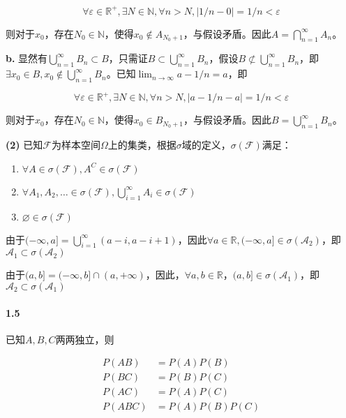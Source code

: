\documentclass{article}
\begin{document}
    \begin{equation}
        \forall \varepsilon \in \mathbb R^+, \exists N \in \mathbb N, \forall n > N, |1/n - 0| = 1/n < \varepsilon
    \end{equation}

    则对于$x_0$，存在$N_0\in \mathbb N$，使得$x_0\not \in A_{N_0 + 1}$，与假设矛盾。因此$A = \bigcap _{n=1} ^{\infty} A_n$。

    \textbf{b.} 显然有$\bigcup _{n=1}^\infty B_n\subset B$，只需证$B\subset \bigcup _{n=1}^\infty B_n$，假设$B\not\subset \bigcup _{n=1}^\infty B_n$，即$\exists x_0\in B, x_0\not \in \bigcup _{n=1}^\infty B_n$。已知$\lim_{n\rightarrow \infty} a - 1/n = a$，即

    \begin{equation}
        \forall \varepsilon \in \mathbb R^+, \exists N\in \mathbb N, \forall n > N, |a - 1/n - a| = 1/n < \varepsilon
    \end{equation}

    则对于$x_0$，存在$N_0\in \mathbb N$，使得$x_0 \in B_{N_0 + 1}$，与假设矛盾。因此$B = \bigcup _{n=1}^\infty B_n$。

    \textbf{(2)} 已知$\mathcal F$为样本空间$\Omega$上的集类，根据$\sigma$域的定义，$\sigma(\mathcal F)$满足：

    \begin{enumerate}
        \item $\forall A\in \sigma(\mathcal F), A^C\in \sigma(\mathcal F)$
        \item $\forall A_1, A_2, \dots \in \sigma(\mathcal F), \bigcup _{i=1}^\infty A_i \in \sigma(\mathcal F)$
        \item $\varnothing \in \sigma(\mathcal F)$
    \end{enumerate}

    由于$(-\infty, a] = \bigcup_{i = 1}^{\infty}(a-i, a-i+1)$，因此$\forall a\in \mathbb R, (-\infty, a]\in \sigma(\mathcal A_2)$，即$\mathcal A_1\subset \sigma(\mathcal A_2)$

    由于$(a, b] = (-\infty, b]\cap (a, +\infty)$，因此，$\forall a, b\in \mathbb R， (a, b]\in \sigma(\mathcal A_1)$，即$\mathcal A_2\subset \sigma(\mathcal A_1)$


    \paragraph*{1.5} 已知$A, B, C$两两独立，则

    \begin{equation}
        \begin{aligned}
            P(AB) &= P(A)P(B) \\
            P(BC) &= P(B)P(C) \\
            P(AC) &= P(A)P(C) \\
            P(ABC) &= P(A)P(B)P(C)
        \end{aligned}
    \end{equation}
\end{document}
